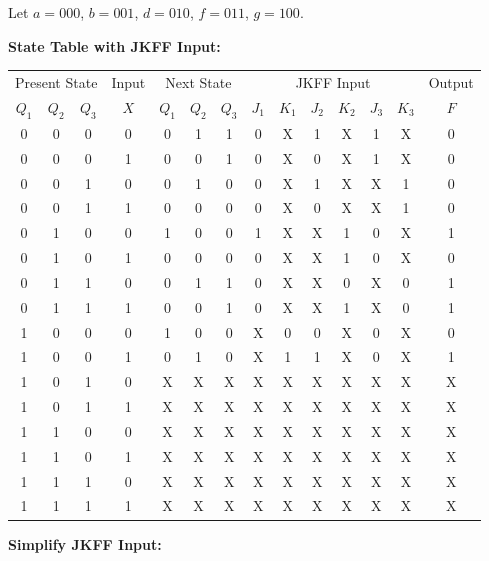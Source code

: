\documentclass[a4paper,12pt]{article}
\begin{document}
\newpage
Let $a = 000$, $b = 001$, $d = 010$, $f = 011$, $g = 100$.

\textbf{State Table with JKFF Input:}

\begin{center}
	\begin{tabular}{cccccccccccccc}
		\toprule
		\multicolumn{3}{c}{Present State} & Input & \multicolumn{3}{c}{Next State} & \multicolumn{6}{c}{JKFF Input} & Output \\
		\cmidrule(lr){1-3} \cmidrule(lr){4-4} \cmidrule(lr){5-7} \cmidrule(lr){8-13} \cmidrule(lr){14-14}
		$Q_1$ & $Q_2$ & $Q_3$ & $X$ & $Q_1$ & $Q_2$ & $Q_3$ & $J_1$ & $K_1$ & $J_2$ & $K_2$ & $J_3$ & $K_3$ & $F$ \\
		\midrule
		0 & 0 & 0 & 0 & 0 & 1 & 1 & 0 & X & 1 & X & 1 & X & 0 \\
		0 & 0 & 0 & 1 & 0 & 0 & 1 & 0 & X & 0 & X & 1 & X & 0 \\
		0 & 0 & 1 & 0 & 0 & 1 & 0 & 0 & X & 1 & X & X & 1 & 0 \\
		0 & 0 & 1 & 1 & 0 & 0 & 0 & 0 & X & 0 & X & X & 1 & 0 \\
		0 & 1 & 0 & 0 & 1 & 0 & 0 & 1 & X & X & 1 & 0 & X & 1 \\
		0 & 1 & 0 & 1 & 0 & 0 & 0 & 0 & X & X & 1 & 0 & X & 0 \\
		0 & 1 & 1 & 0 & 0 & 1 & 1 & 0 & X & X & 0 & X & 0 & 1 \\
		0 & 1 & 1 & 1 & 0 & 0 & 1 & 0 & X & X & 1 & X & 0 & 1 \\
		1 & 0 & 0 & 0 & 1 & 0 & 0 & X & 0 & 0 & X & 0 & X & 0 \\
		1 & 0 & 0 & 1 & 0 & 1 & 0 & X & 1 & 1 & X & 0 & X & 1 \\
		1 & 0 & 1 & 0 & X & X & X & X & X & X & X & X & X & X \\
		1 & 0 & 1 & 1 & X & X & X & X & X & X & X & X & X & X \\
		1 & 1 & 0 & 0 & X & X & X & X & X & X & X & X & X & X \\
		1 & 1 & 0 & 1 & X & X & X & X & X & X & X & X & X & X \\
		1 & 1 & 1 & 0 & X & X & X & X & X & X & X & X & X & X \\
		1 & 1 & 1 & 1 & X & X & X & X & X & X & X & X & X & X \\
		\bottomrule
	\end{tabular}
\end{center}

\textbf{Simplify JKFF Input:}
\end{document}
